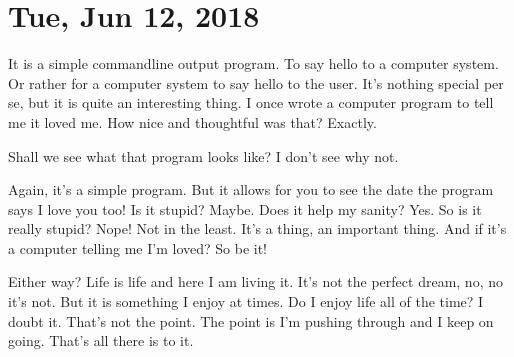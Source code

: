 \section{Tue, Jun 12, 2018}



It is a simple commandline output program. To say hello to a computer system. Or
rather for a computer system to say hello to the user. It's nothing special per
se, but it is quite an interesting thing. I once wrote a computer program to
tell me it loved me. How nice and thoughtful was that? Exactly.

Shall we see what that program looks like? I don't see why not.



Again, it's a simple program. But it allows for you to see the date the program
says I love you too! Is it stupid? Maybe. Does it help my sanity? Yes. So is it
really stupid? Nope! Not in the least. It's a thing, an important thing. And if
it's a computer telling me I'm loved? So be it!

Either way? Life is life and here I am living it. It's not the perfect dream,
no, no it's not. But it is something I enjoy at times. Do I enjoy life all of
the time? I doubt it. That's not the point. The point is I'm pushing through and
I keep on going. That's all there is to it.